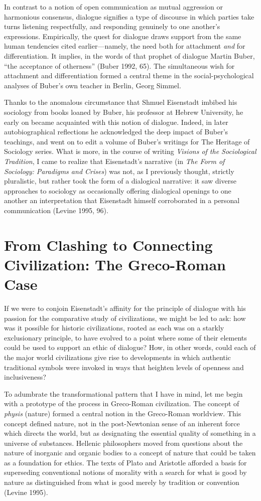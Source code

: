 In contrast to a notion of open communication as mutual aggression or harmonious consensus, dialogue signifies a type of discourse in which parties take turns listening respectfully, and responding genuinely to one another's expressions. Empirically, the quest for dialogue draws support from the same human tendencies cited earlier---namely, the need both for attachment \emph{and} for differentiation. It implies, in the words of that prophet of dialogue Martin Buber, ``the acceptance of otherness'' (Buber 1992, 65). The simultaneous wish for attachment and differentiation formed a central theme in the social-psychological analyses of Buber's own teacher in Berlin, Georg Simmel. 

Thanks to the anomalous circumstance that Shmuel Eisenstadt imbibed his sociology from books loaned by Buber, his professor at Hebrew University, he early on became acquainted with this notion of dialogue. Indeed, in later autobiographical reflections he acknowledged the deep impact of Buber's teachings, and went on to edit a volume of Buber's writings for The Heritage of Sociology series. What is more, in the course of writing \emph{Visions of the Sociological Tradition}, I came to realize that Eisenstadt's narrative (in \emph{The Form of Sociology: Paradigms and Crises}) was not, as I previously thought, strictly pluralistic, but rather took the form of a dialogical narrative: it saw diverse approaches to sociology as occasionally offering dialogical openings to one another an interpretation that Eisenstadt himself corroborated in a personal communication (Levine 1995, 96).

\section*{From Clashing to Connecting Civilization: The Greco-Roman Case}

If we were to conjoin Eisenstadt's affinity for the principle of dialogue with his passion for the comparative study of civilizations, we might be led to ask: how was it possible for historic civilizations, rooted as each was on a starkly exclusionary principle, to have evolved to a point where some of their elements could be used to support an ethic of dialogue? How, in other words, could each of the major world civilizations give rise to developments in which authentic traditional symbols were invoked in ways that heighten levels of openness and inclusiveness?

To adumbrate the transformational pattern that I have in mind, let me begin with a prototype of the process in Greco-Roman civilization. The concept of \emph{physis} (nature) formed a central notion in the Greco-Roman worldview. This concept defined nature, not in the post-Newtonian sense of an inherent force which directs the world, but as designating the essential quality of something in a universe of substances. Hellenic philosophers moved from questions about the nature of inorganic and organic bodies to a concept of nature that could be taken as a foundation for ethics. The texts of Plato and Aristotle afforded a basis for superseding conventional notions of morality with a search for what is good by nature as distinguished from what is good merely by tradition or convention (Levine 1995). 

